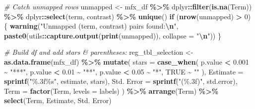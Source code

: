 \documentclass[
]{article}
\newenvironment{Shaded}{\begin{snugshade}}{\end{snugshade}}
\newcommand{\AttributeTok}[1]{\textcolor[rgb]{0.13,0.29,0.53}{#1}}
\newcommand{\CommentTok}[1]{\textcolor[rgb]{0.56,0.35,0.01}{\textit{#1}}}
\newcommand{\ConstantTok}[1]{\textcolor[rgb]{0.56,0.35,0.01}{#1}}
\newcommand{\ControlFlowTok}[1]{\textcolor[rgb]{0.13,0.29,0.53}{\textbf{#1}}}
\newcommand{\DecValTok}[1]{\textcolor[rgb]{0.00,0.00,0.81}{#1}}
\newcommand{\FloatTok}[1]{\textcolor[rgb]{0.00,0.00,0.81}{#1}}
\newcommand{\FunctionTok}[1]{\textcolor[rgb]{0.13,0.29,0.53}{\textbf{#1}}}
\newcommand{\NormalTok}[1]{#1}
\newcommand{\OtherTok}[1]{\textcolor[rgb]{0.56,0.35,0.01}{#1}}
\newcommand{\SpecialCharTok}[1]{\textcolor[rgb]{0.81,0.36,0.00}{\textbf{#1}}}
\newcommand{\StringTok}[1]{\textcolor[rgb]{0.31,0.60,0.02}{#1}}
\begin{document}
\begin{Shaded}
\begin{Highlighting}[]
\CommentTok{\# Catch unmapped rows}
\NormalTok{unmapped }\OtherTok{\textless{}{-}}\NormalTok{ mfx\_df }\SpecialCharTok{\%\textgreater{}\%}\NormalTok{ dplyr}\SpecialCharTok{::}\FunctionTok{filter}\NormalTok{(}\FunctionTok{is.na}\NormalTok{(Term)) }\SpecialCharTok{\%\textgreater{}\%}\NormalTok{ dplyr}\SpecialCharTok{::}\FunctionTok{select}\NormalTok{(term, contrast) }\SpecialCharTok{\%\textgreater{}\%} \FunctionTok{unique}\NormalTok{()}
\ControlFlowTok{if}\NormalTok{ (}\FunctionTok{nrow}\NormalTok{(unmapped) }\SpecialCharTok{\textgreater{}} \DecValTok{0}\NormalTok{) \{}
  \FunctionTok{warning}\NormalTok{(}\StringTok{"Unmapped (term, contrast) pairs found:}\SpecialCharTok{\textbackslash{}n}\StringTok{"}\NormalTok{,}
          \FunctionTok{paste0}\NormalTok{(utils}\SpecialCharTok{::}\FunctionTok{capture.output}\NormalTok{(}\FunctionTok{print}\NormalTok{(unmapped)), }\AttributeTok{collapse =} \StringTok{"}\SpecialCharTok{\textbackslash{}n}\StringTok{"}\NormalTok{))}
\NormalTok{\}}



\CommentTok{\# Build df and add stars \& parentheses:}
\NormalTok{reg\_tbl\_selection }\OtherTok{\textless{}{-}} \FunctionTok{as.data.frame}\NormalTok{(mfx\_df) }\SpecialCharTok{\%\textgreater{}\%}
  \FunctionTok{mutate}\NormalTok{(}
    \AttributeTok{stars =} \FunctionTok{case\_when}\NormalTok{(}
\NormalTok{      p.value }\SpecialCharTok{\textless{}} \FloatTok{0.001} \SpecialCharTok{\textasciitilde{}} \StringTok{"***"}\NormalTok{,}
\NormalTok{      p.value }\SpecialCharTok{\textless{}} \FloatTok{0.01}  \SpecialCharTok{\textasciitilde{}} \StringTok{"**"}\NormalTok{,}
\NormalTok{      p.value }\SpecialCharTok{\textless{}} \FloatTok{0.05}  \SpecialCharTok{\textasciitilde{}} \StringTok{"*"}\NormalTok{,}
      \ConstantTok{TRUE} \SpecialCharTok{\textasciitilde{}} \StringTok{""}
\NormalTok{    ),}
    \AttributeTok{Estimate =} \FunctionTok{sprintf}\NormalTok{(}\StringTok{"\%.3f\%s"}\NormalTok{, estimate, stars),}
    \StringTok{\textasciigrave{}}\AttributeTok{Std. Error}\StringTok{\textasciigrave{}} \OtherTok{=} \FunctionTok{sprintf}\NormalTok{(}\StringTok{"(\%.3f)"}\NormalTok{, std.error),}
    \AttributeTok{Term =} \FunctionTok{factor}\NormalTok{(Term, }\AttributeTok{levels =}\NormalTok{ labels)}
\NormalTok{  ) }\SpecialCharTok{\%\textgreater{}\%}
  \FunctionTok{arrange}\NormalTok{(Term) }\SpecialCharTok{\%\textgreater{}\%} 
  \FunctionTok{select}\NormalTok{(Term, Estimate, }\StringTok{\textasciigrave{}}\AttributeTok{Std. Error}\StringTok{\textasciigrave{}}\NormalTok{)}
\end{Highlighting}
\end{Shaded}
\end{document}
